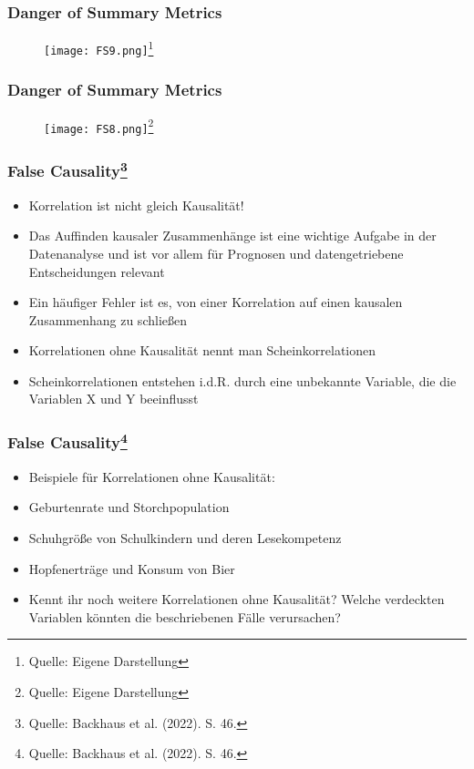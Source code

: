 \documentclass{beamer}
\begin{document}
\begin{frame}
\frametitle{Danger of Summary Metrics}

\begin{figure}
    \centering
    \texttt{[image: FS9.png]}\footnote{Quelle: {Eigene Darstellung}}
    
\end{figure}

\end{frame}

\begin{frame}
\frametitle{Danger of Summary Metrics}

\begin{figure}
    \centering
    \texttt{[image: FS8.png]}\footnote{Quelle: {Eigene Darstellung}}
    
\end{figure}

\end{frame}

\begin{frame}
\frametitle{False Causality\footnote{Quelle: {Backhaus et al. (2022). S. 46.}}}
\begin{itemize}
    \item Korrelation ist nicht gleich Kausalität!
    \item Das Auffinden kausaler Zusammenhänge ist eine wichtige Aufgabe in der Datenanalyse und ist vor allem für Prognosen und datengetriebene Entscheidungen relevant
    \item Ein häufiger Fehler ist es, von einer Korrelation auf einen kausalen Zusammenhang zu schließen
    \item Korrelationen ohne Kausalität nennt man Scheinkorrelationen
    \item Scheinkorrelationen entstehen i.d.R. durch eine unbekannte Variable, die die Variablen X und Y beeinflusst
\end{itemize}
\end{frame}

\begin{frame}
\frametitle{False Causality\footnote{Quelle: {Backhaus et al. (2022). S. 46.}}}
\begin{itemize}
    \item Beispiele für Korrelationen ohne Kausalität:
    \item Geburtenrate und Storchpopulation
    \item Schuhgröße von Schulkindern und deren Lesekompetenz
    \item Hopfenerträge und Konsum von Bier
    \item Kennt ihr noch weitere Korrelationen ohne Kausalität? Welche verdeckten Variablen könnten die beschriebenen Fälle verursachen?
\end{itemize}
\end{frame}
\end{document}
